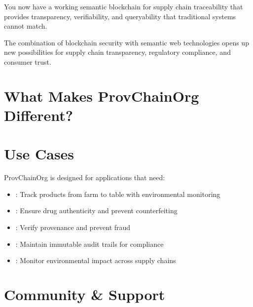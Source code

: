 \documentclass[letterpaper,10pt,english]{sphinxmanual}
\begin{document}
\sphinxAtStartPar
You now have a working semantic blockchain for supply chain traceability that provides transparency, verifiability, and queryability that traditional systems cannot match.

\sphinxAtStartPar
The combination of blockchain security with semantic web technologies opens up new possibilities for supply chain transparency, regulatory compliance, and consumer trust.


\chapter{What Makes ProvChainOrg Different?}
\label{\detokenize{index:what-makes-provchainorg-different}}



\chapter{Use Cases}
\label{\detokenize{index:use-cases}}
\sphinxAtStartPar
ProvChainOrg is designed for applications that need:
\begin{itemize}
\item {} 
\sphinxAtStartPar
{}: Track products from farm to table with environmental monitoring

\item {} 
\sphinxAtStartPar
{}: Ensure drug authenticity and prevent counterfeiting

\item {} 
\sphinxAtStartPar
{}: Verify provenance and prevent fraud

\item {} 
\sphinxAtStartPar
{}: Maintain immutable audit trails for compliance

\item {} 
\sphinxAtStartPar
{}: Monitor environmental impact across supply chains

\end{itemize}


\chapter{Community \& Support}
\label{\detokenize{index:community-support}}
\end{document}
